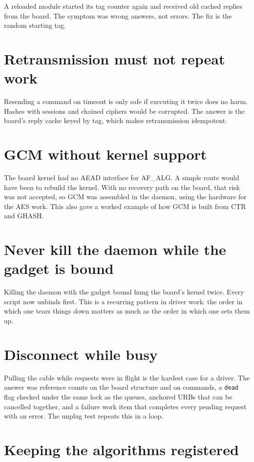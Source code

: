 \documentclass[11pt,a4paper,oneside]{report}
\newcommand{\code}[1]{\texttt{\small #1}}
\begin{document}
A reloaded module started its tag counter again and received old cached replies from the board. The symptom was wrong answers, not errors. The fix is the random starting tag.

\section{Retransmission must not repeat work}

Resending a command on timeout is only safe if executing it twice does no harm. Hashes with sessions and chained ciphers would be corrupted. The answer is the board's reply cache keyed by tag, which makes retransmission idempotent.

\section{GCM without kernel support}

The board kernel had no AEAD interface for AF\_ALG. A simple route would have been to rebuild the kernel. With no recovery path on the board, that risk was not accepted, so GCM was assembled in the daemon, using the hardware for the AES work. This also gave a worked example of how GCM is built from CTR and GHASH.

\section{Never kill the daemon while the gadget is bound}

Killing the daemon with the gadget bound hung the board's kernel twice. Every script now unbinds first. This is a recurring pattern in driver work: the order in which one tears things down matters as much as the order in which one sets them up.

\section{Disconnect while busy}

Pulling the cable while requests were in flight is the hardest case for a driver. The answer was reference counts on the board structure and on commands, a \code{dead} flag checked under the same lock as the queues, anchored URBs that can be cancelled together, and a failure work item that completes every pending request with an error. The unplug test repeats this in a loop.

\section{Keeping the algorithms registered}
\end{document}
